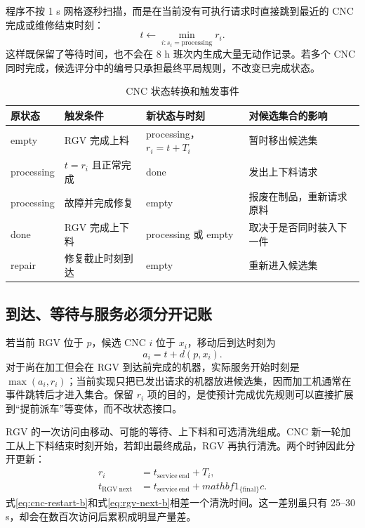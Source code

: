 \documentclass[UTF8,11pt,a4paper]{ctexart}
\begin{document}
程序不按 1 s 网格逐秒扫描，而是在当前没有可执行请求时直接跳到最近的 CNC 完成或维修结束时刻：
\begin{equation}
t\leftarrow \min_{i:s_i=\mathrm{processing}} r_i.
\label{eq:event-jump-b}
\end{equation}
这样既保留了等待时间，也不会在 8 h 班次内生成大量无动作记录。若多个 CNC 同时完成，候选评分中的编号只承担最终平局规则，不改变已完成状态。

\begin{table}[H]
\centering
\caption{CNC 状态转换和触发事件}
\label{tab:state-transition-b}
\small
\begin{tabularx}{\textwidth}{p{2.2cm}p{3.4cm}p{4.3cm}X}
\toprule
原状态 & 触发条件 & 新状态与时刻 & 对候选集合的影响\\
\midrule
empty & RGV 完成上料 & processing，$r_i=t+T_i$ & 暂时移出候选集\\
processing & $t=r_i$ 且正常完成 & done & 发出上下料请求\\
processing & 故障并完成修复 & empty & 报废在制品，重新请求原料\\
done & RGV 完成上下料 & processing 或 empty & 取决于是否同时装入下一件\\
repair & 修复截止时刻到达 & empty & 重新进入候选集\\
\bottomrule
\end{tabularx}
\end{table}

\subsection{到达、等待与服务必须分开记账}

若当前 RGV 位于 $p$，候选 CNC $i$ 位于 $x_i$，移动后到达时刻为
\begin{equation}
a_i=t+d(p,x_i).
\label{eq:arrival-b}
\end{equation}
对于尚在加工但会在 RGV 到达前完成的机器，实际服务开始时刻是 $\max(a_i,r_i)$；当前实现只把已发出请求的机器放进候选集，因而加工机通常在事件跳转后才进入集合。保留 $r_i$ 项的目的，是使预计完成优先规则可以直接扩展到“提前派车”等变体，而不改状态接口。

RGV 的一次访问由移动、可能的等待、上下料和可选清洗组成。CNC 新一轮加工从上下料结束时刻开始，若卸出最终成品，RGV 再执行清洗。两个时钟因此分开更新：
\begin{align}
r_i&=t_{\mathrm{service\ end}}+T_i,\label{eq:cnc-restart-b}\\
t_{\mathrm{RGV\ next}}&=t_{\mathrm{service\ end}}+mathbf 1_{\{\mathrm{final}\}}c.
\label{eq:rgv-next-b}
\end{align}
式\eqref{eq:cnc-restart-b}和式\eqref{eq:rgv-next-b}相差一个清洗时间。这一差别虽只有 25--30 s，却会在数百次访问后累积成明显产量差。
\end{document}
